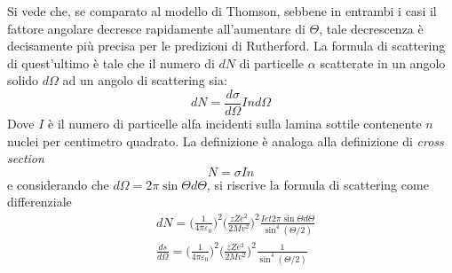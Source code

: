 Si vede che, se comparato al modello di Thomson, sebbene in entrambi i casi il fattore angolare decresce rapidamente all'aumentare di $\Theta$, tale decrescenza è decisamente più precisa per le predizioni di Rutherford.
La formula di scattering di quest'ultimo è tale che il numero di $dN$ di particelle $\alpha$ scatterate in un angolo solido $d \Omega$ ad un angolo di scattering sia:
\begin{equation}
dN =  \frac{ d\sigma }{d\Omega} I n d\Omega
\end{equation}
Dove $I$ è il numero di particelle alfa incidenti sulla lamina sottile contenente $n$ nuclei per centimetro quadrato.
La definizione è analoga alla definizione di \textit{cross section}
\begin{equation}
N = \sigma I n
\end{equation}
e considerando che $d\Omega = 2\pi\sin\Theta d\Theta$, si riscrive la formula di scattering come differenziale
\begin{equation}
\begin{split}
& dN =  \biggl( \frac{1}{4\pi \varepsilon_0} \biggr) ^2  \biggl( \frac{z Z e^2}{2 M v^2} \biggr)^2  \frac{ I e t 2 \pi \sin\Theta d\Theta }{ \sin^4(\Theta/2) } \\
& \frac{ds}{d\Omega} = \biggl( \frac{1}{4 \pi \varepsilon_0} \biggr)^2  \biggl( \frac{z Z e^2}{2 M v^2} \biggr)^2  \frac{ 1 }{ \sin^4(\Theta/2) }
\end{split}
\end{equation}

